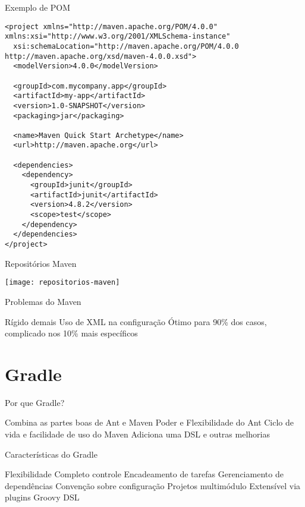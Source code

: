 \documentclass{beamer}
\begin{document}
\begin{frame}[fragile]{Exemplo de POM}
 \begin{verbatim}
<project xmlns="http://maven.apache.org/POM/4.0.0" xmlns:xsi="http://www.w3.org/2001/XMLSchema-instance"
  xsi:schemaLocation="http://maven.apache.org/POM/4.0.0 http://maven.apache.org/xsd/maven-4.0.0.xsd">
  <modelVersion>4.0.0</modelVersion>
 
  <groupId>com.mycompany.app</groupId>
  <artifactId>my-app</artifactId>
  <version>1.0-SNAPSHOT</version>
  <packaging>jar</packaging>
 
  <name>Maven Quick Start Archetype</name>
  <url>http://maven.apache.org</url>
 
  <dependencies>
    <dependency>
      <groupId>junit</groupId>
      <artifactId>junit</artifactId>
      <version>4.8.2</version>
      <scope>test</scope>
    </dependency>
  </dependencies>
</project>
  \end{verbatim}
\end{frame}

\begin{frame}{Repositórios Maven}
  \begin{center}
    \texttt{[image: repositorios-maven]}
  \end{center}
\end{frame}

\begin{frame}{Problemas do Maven}
 \begin{outline}
    Rígido demais
    Uso de XML na configuração
    Ótimo para 90\% dos casos, complicado nos 10\% mais específicos
 \end{outline}
\end{frame}

\section{Gradle}

\begin{frame}{Por que Gradle?}
 \begin{outline}
    Combina as partes boas de Ant e Maven
    \2 Poder e Flexibilidade do Ant
    \2 Ciclo de vida e facilidade de uso do Maven
    Adiciona uma DSL e outras melhorias
 \end{outline}
\end{frame}

\begin{frame}{Características do Gradle}
 \begin{outline}
    Flexibilidade
    Completo controle
    Encadeamento de tarefas
    Gerenciamento de dependências
    Convenção sobre configuração
    Projetos multimódulo
    Extensível via plugins
    Groovy DSL
 \end{outline}
\end{frame}
\end{document}
